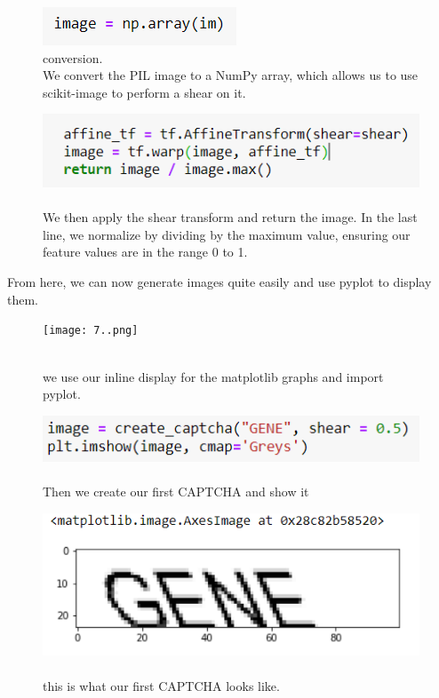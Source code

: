 \documentclass[onecolumn]{article}
\begin{document}
\begin{figure}[hb!]
    \centering
    \includegraphics[width=.3\linewidth]{5..png}
\caption{\label{fig:demo-bad}
\centering
conversion.\\We convert the PIL image to a NumPy array, which allows us to use scikit-image to perform a shear on it.}
\end{figure}

\begin{figure}[hb!]
    \centering
    \includegraphics[width=.7\linewidth]{6..png}
\caption{\label{fig:demo-bad}
\centering
\\We then apply the shear transform and return the image. In the last line, we normalize by dividing by the maximum value, ensuring our
feature values are in the range 0 to 1.}
\end{figure}

\newpage
\begin{t}
 From here, we can now generate images quite easily and use pyplot to display them.
\end{t}



\begin{figure}[h]
    \centering
    \texttt{[image: 7..png]}
\caption{\label{fig:demo-bad}
\centering
\\we use our inline display for the matplotlib graphs and import pyplot.}
\end{figure}

\begin{figure}[h]
    \centering
    \includegraphics[width=.5\linewidth]{8..png}
\caption{\label{fig:demo-bad}
\centering
\\Then we create our first CAPTCHA and show it}
\end{figure}

\begin{figure}[h]
    \centering
    \includegraphics[width=.5\linewidth]{9..png}
\caption{\label{fig:demo-bad}
\centering
\\this is what our first CAPTCHA looks like.}
\end{figure}
\end{document}

